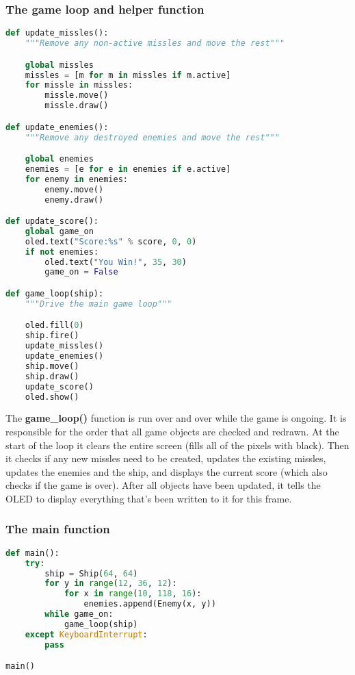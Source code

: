 \subsubsection{The game loop and helper function}
\begin{lstlisting}[language=Python,caption=The game loop and helper functions]
def update_missles():
    """Remove any non-active missles and move the rest"""

    global missles
    missles = [m for m in missles if m.active]
    for missle in missles:
        missle.move()
        missle.draw()

def update_enemies():
    """Remove any destroyed enemies and move the rest"""

    global enemies
    enemies = [e for e in enemies if e.active]
    for enemy in enemies:
        enemy.move()
        enemy.draw()

def update_score():
    global game_on
    oled.text("Score:%s" % score, 0, 0)
    if not enemies:
        oled.text("You Win!", 35, 30)
        game_on = False

def game_loop(ship):
    """Drive the main game loop"""

    oled.fill(0)
    ship.fire()
    update_missles()
    update_enemies()
    ship.move()
    ship.draw()
    update_score()
    oled.show()
\end{lstlisting}

The \textbf{game\_loop()} function is run over and over while the game is ongoing. It is responsible for
the order that all game objects are checked and redrawn. At the start of the loop it clears the entire
screen (fills all of the pixels with black). Then it checks if any new missles need to be created, updates
the existing missles, updates the enemies and the ship, and displays the current score (which also checks
if the game is over). After all objects have been updated, it tells the OLED to display everything that's
been written to it for this frame.

\subsubsection{The main function}
\begin{lstlisting}[language=Python,caption=The main function]
    def main():
    try:
        ship = Ship(64, 64)
        for y in range(12, 36, 12):
            for x in range(10, 118, 16):
                enemies.append(Enemy(x, y))
        while game_on:
            game_loop(ship)
    except KeyboardInterrupt:
        pass

main()
\end{lstlisting}

